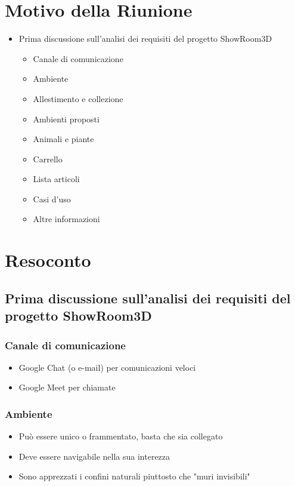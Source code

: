 \section{Motivo della Riunione}
\begin{itemize}
    \item Prima discussione sull'analisi dei requisiti del progetto ShowRoom3D
    \begin{itemize}
        \item Canale di comunicazione
        \item Ambiente
        \item Allestimento e collezione
        \item Ambienti proposti
        \item Animali e piante
        \item Carrello
        \item Lista articoli
        \item Casi d'uso
        \item Altre informazioni
    \end{itemize}
\end{itemize}
\section{Resoconto}
\subsection{Prima discussione sull'analisi dei requisiti del progetto ShowRoom3D}
\subsubsection{Canale di comunicazione}
\begin{itemize}
    \item Google Chat (o e-mail) per comunicazioni veloci
    \item Google Meet per chiamate
\end{itemize}
\subsubsection{Ambiente}
\begin{itemize}
    \item Può essere unico o frammentato, basta che sia collegato
    \item Deve essere navigabile nella sua interezza 
    \item Sono apprezzati i confini naturali piuttosto che "muri invisibili"
\end{itemize}
